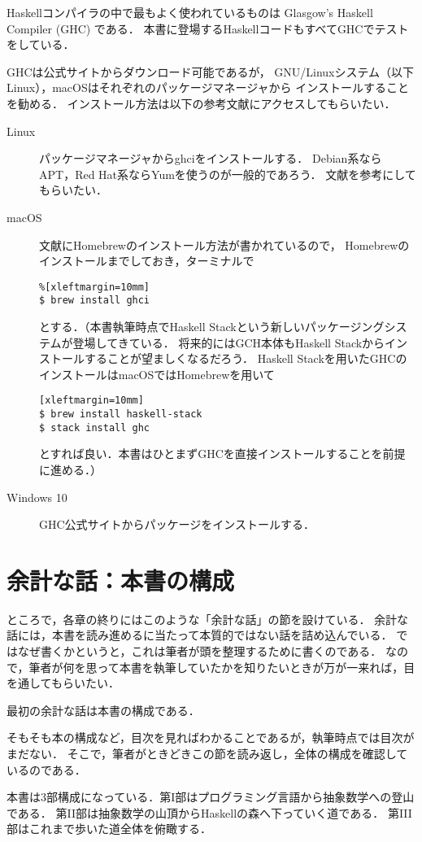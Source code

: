 \documentclass[twocolumn]{jsbook}
\newcommand{\programminglanguage}[1]{\textsf{#1}}
\newcommand{\haskell}{\programminglanguage{Haskell}}
\begin{document}
\haskell コンパイラの中で最もよく使われているものは Glasgow's Haskell Compiler (GHC) である．
本書に登場する\haskell コードもすべてGHCでテストをしている．

GHCは公式サイト\cite{haskellplatform}からダウンロード可能であるが，
GNU/Linuxシステム（以下Linux），macOSはそれぞれのパッケージマネージャから
インストールすることを勧める．
インストール方法は以下の参考文献にアクセスしてもらいたい．
\begin{description}
\item[Linux] パッケージマネージャからghciをインストールする．
Debian系ならAPT，Red Hat系ならYumを使うのが一般的であろう．
文献\cite{linux}を参考にしてもらいたい．
\item[macOS] 文献\cite{osx}にHomebrewのインストール方法が書かれているので，
Homebrewのインストールまでしておき，ターミナルで
\begin{verbatim}%[xleftmargin=10mm]
$ brew install ghci
\end{verbatim}%
とする．（本書執筆時点でHaskell Stackという新しいパッケージングシステムが登場してきている．
将来的にはGCH本体もHaskell Stackからインストールすることが望ましくなるだろう．
Haskell Stackを用いたGHCのインストールはmacOSではHomebrewを用いて
\begin{verbatim}[xleftmargin=10mm]
$ brew install haskell-stack
$ stack install ghc
\end{verbatim}%
とすれば良い．本書はひとまずGHCを直接インストールすることを前提に進める．）
\item[Windows 10] GHC公式サイト\cite{haskellplatform}からパッケージをインストールする．
\end{description}

\section{余計な話：本書の構成}

ところで，各章の終りにはこのような「余計な話」の節を設けている．
余計な話には，本書を読み進めるに当たって本質的ではない話を詰め込んでいる．
ではなぜ書くかというと，これは筆者が頭を整理するために書くのである．
なので，筆者が何を思って本書を執筆していたかを知りたいときが万が一来れば，目を通してもらいたい．

最初の余計な話は本書の構成である．

そもそも本の構成など，目次を見ればわかることであるが，執筆時点では目次がまだない．
そこで，筆者がときどきこの節を読み返し，全体の構成を確認しているのである．

本書は3部構成になっている．第I部はプログラミング言語から抽象数学への登山である．
第II部は抽象数学の山頂から\haskell の森へ下っていく道である．
第III部はこれまで歩いた道全体を俯瞰する．
\end{document}
